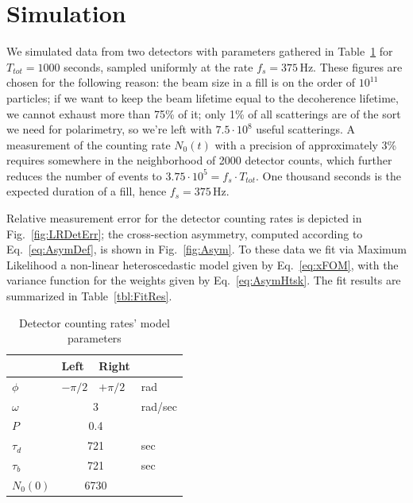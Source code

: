 \documentclass[a4paper]{jacow}
\newcommand{\vp}[2]{{#1}\cdot 10^{#2}}
\newcommand{\LTb}{\tau_b}
\newcommand{\LTd}{\tau_d}
\begin{document}
\section{Simulation}
We simulated data from two detectors with parameters gathered in Table~\ref{tbl:DetCntRtParam} for $T_{tot}=1000$ seconds, sampled uniformly at the rate $f_s = 375$\,Hz. These figures are chosen for the following reason: the beam size in a fill is on the order of $10^{11}$ particles; if we want to keep the beam lifetime equal to the decoherence lifetime, we cannot exhaust more than 75\% of it; only 1\% of all scatterings are of the sort we need for polarimetry, so we're left with $\vp{7.5}{8}$ useful scatterings. A measurement of the counting rate $N_0(t)$ with a precision of approximately 3\% requires somewhere in the neighborhood of 2000 detector counts, which further reduces the number of events to $\vp{3.75}{5}= f_s\cdot T_{tot}$. One thousand seconds is the expected duration of a fill, hence $f_s = 375$\,Hz. 

Relative measurement error for the detector counting rates is depicted in Fig.~\ref{fig:LRDetErr}; the cross-section asymmetry, computed according to Eq.~\eqref{eq:AsymDef}, is shown in Fig.~\ref{fig:Asym}.
To these data we fit via Maximum Likelihood a non-linear heteroscedastic model %
given by Eq.~\eqref{eq:xFOM}, with the variance function for the weights given by Eq.~\eqref{eq:AsymHtsk}. The fit results are summarized in Table~\ref{tbl:FitRes}.
\begin{table}[h]
	\caption{Detector counting rates' model parameters\label{tbl:DetCntRtParam}}
	\centering
	\begin{tabular}{llll}
		\hline
		&   Left   &     Right     &  \\ \hline
		$\phi$  & $-\pi/2$ &   $+\pi/2$    &   rad   \\
		$\omega$ &  \multicolumn{2}{c}{3}   & rad/sec \\
		$P$    & \multicolumn{2}{c}{0.4}  &  \\
		$\LTd$  & \multicolumn{2}{c}{721}  &   sec   \\
		$\LTb$  & \multicolumn{2}{c}{721}  &   sec   \\
		$N_0(0)$ & \multicolumn{2}{c}{6730} &  \\ \hline
	\end{tabular}
\end{table}
\end{document}
